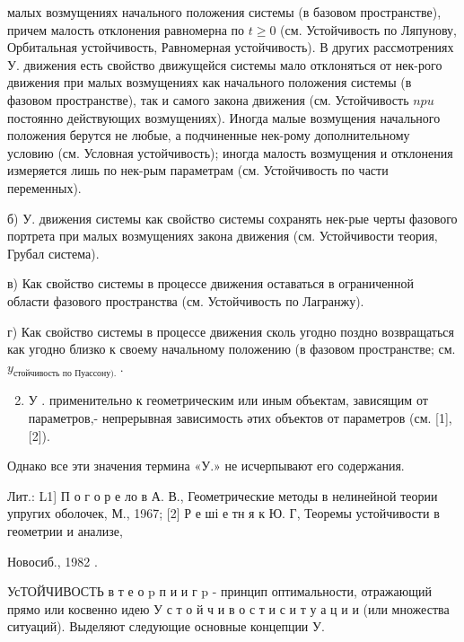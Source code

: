 \documentclass[10pt]{article}
\begin{document}
малых возмущениях начального положения системы (в базовом пространстве), причем малость отклонения равномерна по $t \geqslant 0$ (см. Устойчивость по Ляпунову, Орбитальная устойчивость, Равномерная устойчивость). В других рассмотрениях У. движения есть свойство движущейся системы мало отклоняться от нек-рого движения при малых возмущениях как начального положения системы (в фазовом пространстве), так и самого закона движения (см. Устойчивость $n p u$ постоянно действующих возмущениях). Иногда малые возмущения начального положения берутся не любые, а подчиненные нек-рому дополнительному условию (см. Условная устойчивость); иногда малость возмущения и отклонения измеряется лишь по нек-рым параметрам (см. Устойчивость по части переменных).



б) У. движения системы как свойство системы сохранять нек-рые черты фазового портрета при малых возмущениях закона движения (см. Устойчивости теория, Грубал система).



в) Как свойство системы в процессе движения оставаться в ограниченной области фазового пространства (см. Устойчивость по Лагранжу).



г) Как свойство системы в процессе движения сколь угодно поздно возвращаться как угодно близко к своему начальному положению (в фазовом пространстве; см. $y_{\text {стойчивость по Пуассону). }}$.



\begin{enumerate}

  \setcounter{enumi}{1}

  \item У . применительно к геометрическим или иным объектам, зависящим от параметров,- непрерывная зависимость әтих объектов от параметров (см. [1], [2]).

\end{enumerate}



Однако все эти значения термина «У.» не исчерпывают его содержания.



Лит.: L1] П о г о р е ло в А. В., Геометрические методы в нелинейной теории упругих оболочек, М., 1967; [2] Р е ші е тн я к Ю. Г, Теоремы устойчивости в геометрии и анализе,

Новосиб., 1982 .



УсТОЙЧИВОСТЬ в т е о p п и и г p - принцип оптимальности, отражающий прямо или косвенно идею У с т о й ч и в о с т и с и т у а ц и и (или множества ситуаций). Выделяют следующие основные концепции У.
\end{document}
